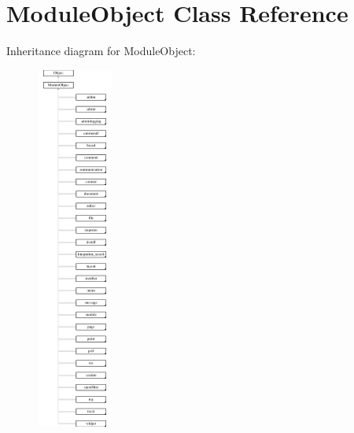 \hypertarget{classModuleObject}{\section{Module\-Object Class Reference}
\label{classModuleObject}
}
Inheritance diagram for Module\-Object\-:\begin{figure}[H]
\begin{center}
\leavevmode
\includegraphics[height=12.000000cm]{classModuleObject}
\end{center}
\end{figure}

